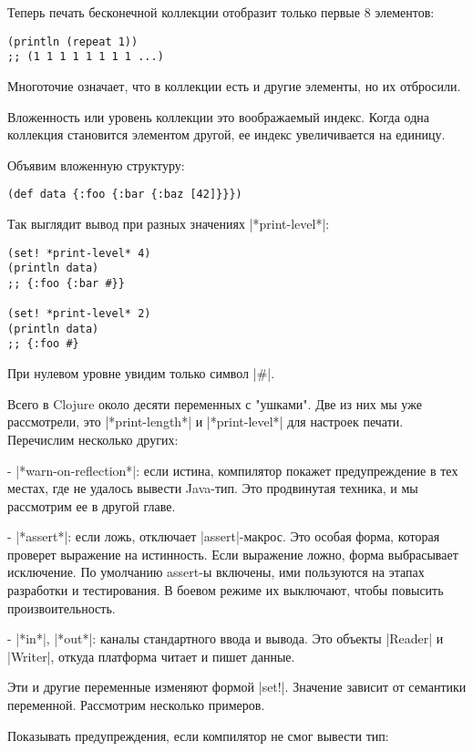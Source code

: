 Теперь печать бесконечной коллекции отобразит только первые 8 элементов:

\begin{verbatim}
(println (repeat 1))
;; (1 1 1 1 1 1 1 1 ...)
\end{verbatim}

Многоточие означает, что в коллекции есть и другие элементы, но их отбросили.

Вложенность или уровень коллекции это воображаемый индекс. Когда одна коллекция
становится элементом другой, ее индекс увеличивается на единицу.

Объявим вложенную структуру:

\begin{verbatim}
(def data {:foo {:bar {:baz [42]}}})
\end{verbatim}

Так выглядит вывод при разных значениях \spverb|*print-level*|:

\begin{verbatim}
(set! *print-level* 4)
(println data)
;; {:foo {:bar #}}

(set! *print-level* 2)
(println data)
;; {:foo #}
\end{verbatim}

При нулевом уровне увидим только символ \spverb|#|.

Всего в Clojure около десяти переменных с "ушками". Две из них мы уже
рассмотрели, это \spverb|*print-length*| и \spverb|*print-level*| для настроек
печати. Перечислим несколько других:

- \spverb|*warn-on-reflection*|: если истина, компилятор покажет предупреждение в тех
  местах, где не удалось вывести Java-тип. Это продвинутая техника, и мы
  рассмотрим ее в другой главе.

- \spverb|*assert*|: если ложь, отключает \spverb|assert|-макрос. Это особая форма, которая
  проверет выражение на истинность. Если выражение ложно, форма выбрасывает
  исключение. По умолчанию assert-ы включены, ими пользуются на этапах
  разработки и тестирования. В боевом режиме их выключают, чтобы повысить
  произвоительность.

- \spverb|*in*|, \spverb|*out*|: каналы стандартного ввода и вывода. Это объекты \spverb|Reader| и
  \spverb|Writer|, откуда платформа читает и пишет данные.

Эти и другие переменные изменяют формой \spverb|set!|. Значение зависит от семантики
переменной. Рассмотрим несколько примеров.

Показывать предупреждения, если компилятор не смог вывести тип:


